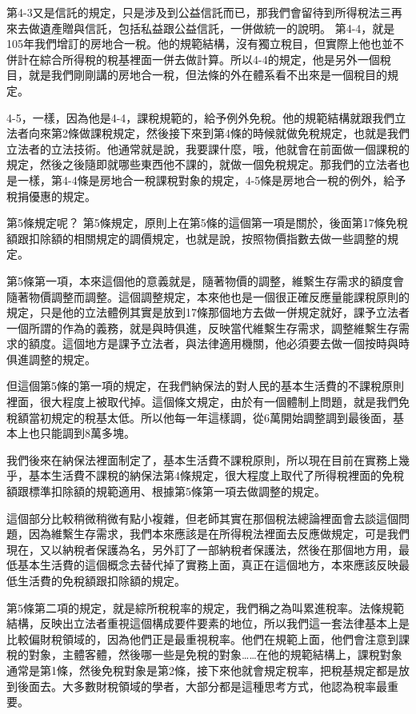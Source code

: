 \documentclass[]{ctexbook}
\begin{document}
第4-3又是信託的規定，只是涉及到公益信託而已，那我們會留待到所得稅法三再來去做遺產贈與信託，包括私益跟公益信託，一併做統一的說明。
第4-4，就是105年我們增訂的房地合一稅。他的規範結構，沒有獨立稅目，但實際上他也並不併計在綜合所得稅的稅基裡面一併去做計算。所以4-4的規定，他是另外一個稅目，就是我們剛剛講的房地合一稅，但法條的外在體系看不出來是一個稅目的規定。

4-5，一樣，因為他是4-4，課稅規範的，給予例外免稅。他的規範結構就跟我們立法者向來第2條做課稅規定，然後接下來到第4條的時候就做免稅規定，也就是我們立法者的立法技術。他通常就是說，我要課什麼，哦，他就會在前面做一個課稅的規定，然後之後隨即就哪些東西他不課的，就做一個免稅規定。那我們的立法者也是一樣，第4-4條是房地合一稅課稅對象的規定，4-5條是房地合一稅的例外，給予稅捐優惠的規定。

第5條規定呢？ 第5條規定，原則上在第5條的這個第一項是關於，後面第17條免稅額跟扣除額的相關規定的調價規定，也就是說，按照物價指數去做一些調整的規定。

第5條第一項，本來這個他的意義就是，隨著物價的調整，維繫生存需求的額度會隨著物價調整而調整。這個調整規定，本來他也是一個很正確反應量能課稅原則的規定，只是他的立法體例其實是放到17條那個地方去做一併規定就好，課予立法者一個所謂的作為的義務，就是與時俱進，反映當代維繫生存需求，調整維繫生存需求的額度。這個地方是課予立法者，與法律適用機關，他必須要去做一個按時與時俱進調整的規定。

但這個第5條的第一項的規定，在我們納保法的對人民的基本生活費的不課稅原則裡面，很大程度上被取代掉。這個條文規定，由於有一個體制上問題，就是我們免稅額當初規定的稅基太低。所以他每一年這樣調，從6萬開始調整調到最後面，基本上也只能調到8萬多塊。

我們後來在納保法裡面制定了，基本生活費不課稅原則，所以現在目前在實務上幾乎，基本生活費不課稅的納保法第4條規定，很大程度上取代了所得稅裡面的免稅額跟標準扣除額的規範適用、根據第5條第一項去做調整的規定。

這個部分比較稍微稍微有點小複雜，但老師其實在那個稅法總論裡面會去談這個問題，因為維繫生存需求，我們本來應該是在所得稅法裡面去反應做規定，可是我們現在，又以納稅者保護為名，另外訂了一部納稅者保護法，然後在那個地方用，最低基本生活費的這個概念去替代掉了實務上面，真正在這個地方，本來應該反映最低生活費的免稅額跟扣除額的規定。

第5條第二項的規定，就是綜所稅稅率的規定，我們稱之為叫累進稅率。法條規範結構，反映出立法者重視這個構成要件要素的地位，所以我們這一套法律基本上是比較偏財稅領域的，因為他們正是最重視稅率。他們在規範上面，他們會注意到課稅的對象，主體客體，然後哪一些是免稅的對象\ldots\ldots 在他的規範結構上，課稅對象通常是第1條，然後免稅對象是第2條，接下來他就會規定稅率，把稅基規定都是放到後面去。大多數財稅領域的學者，大部分都是這種思考方式，他認為稅率最重要。
\end{document}
